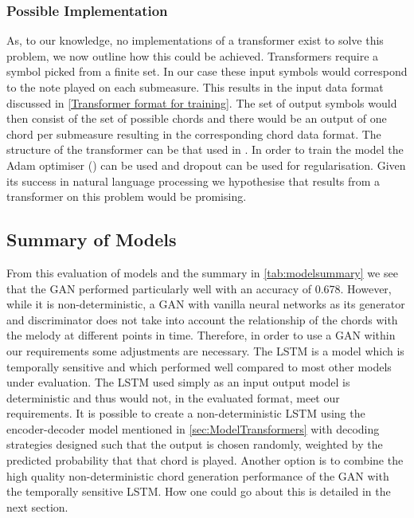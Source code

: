 \subsubsection{Possible Implementation}
As, to our knowledge, no implementations of a transformer exist to solve this problem, we now outline how this could be achieved.
Transformers require a symbol picked from a finite set. 
In our case these input symbols would correspond to the note played on each submeasure.
This results in the input data format discussed in \cref{Transformer format for training}.
The set of output symbols would then consist of the set of possible chords and there would be an output of one chord per submeasure resulting in the corresponding chord data format.
The structure of the transformer can be that used in .
In order to train the model the Adam optimiser (\cite{Adam}) can be used and dropout can be used for regularisation.
Given its success in natural language processing we hypothesise that results from a transformer on this problem would be promising.

\subsection{Summary of Models}

From this evaluation of models and the summary in \cref{tab:modelsummary} we see that the GAN performed particularly well with an accuracy of 0.678.
However, while it is non-deterministic, a GAN  with vanilla neural networks as its generator and discriminator does not take into account the relationship of the chords with the melody at different points in time.
Therefore, in order to use a GAN within our requirements some adjustments are necessary.
The LSTM is a model which is temporally sensitive and which performed well compared to most other models under evaluation.
The LSTM used simply as an input output model is deterministic and thus would not, in the evaluated format, meet our requirements.
It is possible to create a non-deterministic LSTM using the encoder-decoder model mentioned in \cref{sec:ModelTransformers} with decoding strategies designed such that the output is chosen randomly, weighted by the predicted probability that that chord is played.
Another option is to combine the high quality non-deterministic chord generation performance of the GAN with the temporally sensitive LSTM.
How one could go about this is detailed in the next section.

